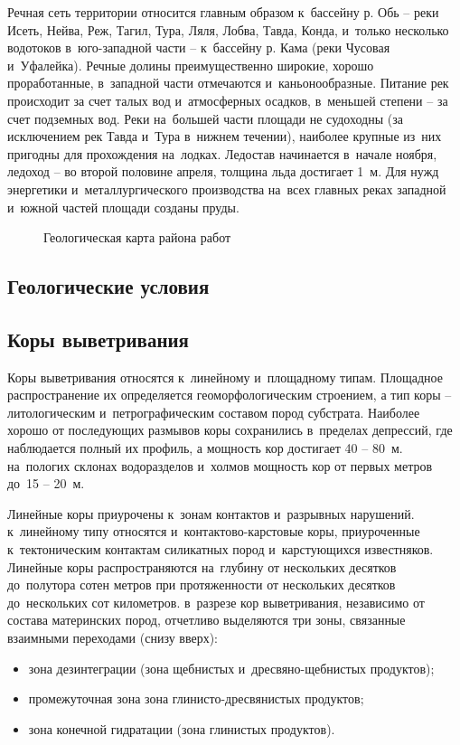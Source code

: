 Речная сеть территории относится главным образом к~бассейну р. Обь  --  реки Исеть, Нейва, Реж, Тагил, Тура, Ляля, Лобва, Тавда, Конда, и~только несколько водотоков в~юго-западной части  --  к~бассейну р. Кама (реки Чусовая и~Уфалейка). Речные долины преимущественно широкие, хорошо проработанные, в~западной части отмечаются и~каньонообразные. Питание рек происходит за счет талых вод и~атмосферных осадков, в~меньшей степени  --  за счет подземных вод. Реки на~большей части площади не судоходны (за исключением рек Тавда и~Тура в~нижнем течении), наиболее крупные из~них пригодны для прохождения на~лодках. Ледостав начинается в~начале ноября, ледоход  --  во второй половине апреля, толщина льда достигает 1~м. Для нужд энергетики и~металлургического производства на~всех
главных реках западной и~южной частей площади созданы пруды.

\begin{figure}[h]
	\caption{Геологическая карта района работ}
\end{figure}

\subsection*{Геологические условия}
\txtGeology

\subsection*{Коры выветривания}
Коры выветривания относятся к~линейному и~площадному типам. Площадное распространение их определяется геоморфологическим строением, а тип коры  --  литологическим и~петрографическим составом пород субстрата. Наиболее хорошо от последующих размывов коры сохранились в~пределах депрессий, где наблюдается полный их профиль, а  мощность кор достигает 40  --  80~м. на~пологих склонах водоразделов и~холмов мощность кор от первых метров до~15 -- 20~м.

Линейные коры приурочены к~зонам контактов и~разрывных нарушений. к~линейному типу относятся и~контактово-карстовые коры, приуроченные к~тектоническим контактам силикатных пород и~карстующихся
известняков. Линейные коры распространяются на~глубину от нескольких десятков до~полутора сотен метров при протяженности от нескольких десятков до~нескольких сот километров. в~разрезе кор выветривания, независимо от состава материнских пород, отчетливо выделяются три зоны, связанные взаимными переходами (снизу вверх): 
\begin{itemize}
\item зона дезинтеграции (зона щебнистых и~дресвяно-щебнистых продуктов);
\item промежуточная зона зона глинисто-дресвянистых продуктов;
\item зона конечной гидратации (зона глинистых продуктов).
\end{itemize}



